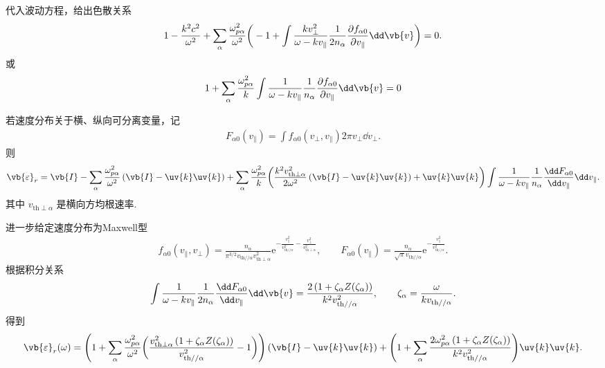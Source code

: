\begin{exbox}
	代入波动方程，给出色散关系
	\begin{align*}
		1 - \frac{k^2c^2}{\omega^2} + \sum_\alpha\frac{\omega_{p\alpha}^2}{\omega^2}\bigg(-1 + \int\frac{k v_\perp^2}{\omega-k v_{\parallel}}\frac{1}{2n_\alpha}\frac{\partial f_{\alpha0}}{\partial v_{\parallel}}\dd \vb{v}\bigg) = 0.
	\end{align*}
	或
	\begin{align*}
		1 + \sum_\alpha\frac{\omega_{p\alpha}^2}{k}\int\frac{1}{\omega-k v_{\parallel}}\frac{1}{n_\alpha}\frac{\partial f_{\alpha0}}{\partial v_{\parallel}}\dd \vb{v} = 0
	\end{align*}
\end{exbox}

\begin{exbox}
	\label{eq:plasma_separable_xy}

	若速度分布关于横、纵向可分离变量，记
	\begin{align*}
		F_{\alpha0}(v_{\parallel}) = \int f_{\alpha0}(v_\perp,v_{\parallel})2\pi v_\perp\dd v_\perp.
	\end{align*}
	则
	\begin{align*}
		\vb{\varepsilon}_r = \vb{I} - \sum_\alpha\frac{\omega_{p\alpha}^2}{\omega^2}\left(\vb{I}-\uv{k}\uv{k}\right) + \sum_\alpha\frac{\omega_{p\alpha}^2}{k}\bigg(\frac{k^2v_{\mathrm{th}\perp\alpha}^2}{2\omega^2}\left(\vb{I}-\uv{k}\uv{k}\right)+\uv{k}\uv{k}\bigg)\int\frac{1}{\omega-k v_{\parallel}}\frac{1}{n_\alpha}\frac{\dd F_{\alpha0}}{\dd v_{\parallel}}\dd v_{\parallel}.
	\end{align*}
	其中 \(v_{\mathrm{th}\perp\alpha}\) 是横向方均根速率.

	进一步给定速度分布为Maxwell型
	\begin{align*}
		f_{\alpha0}(v_{\parallel},v_\perp) = \frac{n_\alpha}{\pi^{3/2}v_{\mathrm{th}//\alpha}v_{\mathrm{th}\perp\alpha}^2}\mathrm{e}^{-\frac{v_{\parallel}^2}{v_{\mathrm{th}//\alpha}^2}-\frac{v_\perp^2}{v_{\mathrm{th}\perp\alpha}^2}},\qquad F_{\alpha0}(v_{\parallel}) = \frac{n_\alpha}{\sqrt{\pi}v_{\mathrm{th}//\alpha}}\mathrm{e}^{-\frac{v_{\parallel}^2}{v_{\mathrm{th}//\alpha}^2}}.
	\end{align*}
	根据积分关系
	\begin{align*}
		\int\frac{1}{\omega-k v_{\parallel}}\frac{1}{2n_\alpha}\frac{\dd F_{\alpha0}}{\dd v_{\parallel}}\dd \vb{v} = \frac{2\left(1+\zeta_\alpha Z(\zeta_\alpha)\right)}{k^2v_{\mathrm{th}//\alpha}^2},\qquad \zeta_\alpha = \frac{\omega}{k v_{\mathrm{th}//\alpha}}.
	\end{align*}
	得到
	\begin{align*}
		\vb{\varepsilon}_r(\omega) = \Bigg(1 + \sum_\alpha\frac{\omega_{p\alpha}^2}{\omega^2}\bigg(\frac{v_{\mathrm{th}\perp\alpha}^2\left(1+\zeta_\alpha Z(\zeta_\alpha)\right)}{v_{\mathrm{th}//\alpha}^2}-1\bigg)\Bigg)\left(\vb{I}-\uv{k}\uv{k}\right) + \Bigg(1 + \sum_\alpha\frac{2\omega_{p\alpha}^2\left(1+\zeta_\alpha Z(\zeta_\alpha)\right)}{k^2v_{\mathrm{th}//\alpha}^2}\Bigg)\uv{k}\uv{k}.
	\end{align*}


\end{exbox}
